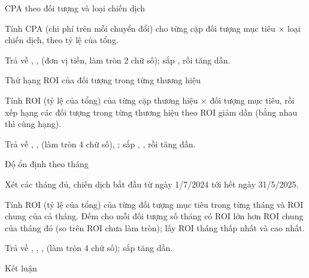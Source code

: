 \documentclass[11pt,a4paper]{article}
\begin{document}
\begin{cauhoi}[ma=mkt-c8-doi-tuong-dang-tang-ngan-sach, dulieu=mkt, domain=customer,
  hinhthuc=case, cap=hard, diem=50, tacgia={A}, trangthai=review, bokiemtra={public, hidden-1}, thutu=co, saiso=0.01]
\begin{buoc}[ma=b2, diem=10, hinhthuc=write, bang={campaigns, campaign_types}]{CPA theo đối tượng và loại chiến dịch}
  \begin{yeucau}
    \item Tính CPA (chi phí trên mỗi chuyển đổi) cho từng cặp đối tượng mục tiêu × loại chiến dịch, theo tỷ lệ của tổng.
    \item Trả về , ,  (đơn vị tiền, làm tròn 2 chữ số); sắp , rồi  tăng dần.
  \end{yeucau}
\end{buoc}
\begin{buoc}[ma=b3, diem=10, hinhthuc=write, bang={campaigns, brands}]{Thứ hạng ROI của đối tượng trong từng thương hiệu}
  \begin{yeucau}
    \item Tính ROI (tỷ lệ của tổng) của từng cặp thương hiệu × đối tượng mục tiêu, rồi xếp hạng các đối tượng trong từng thương hiệu theo ROI giảm dần (bằng nhau thì cùng hạng).
    \item Trả về , ,  (làm tròn 4 chữ số), ; sắp , , rồi  tăng dần.
  \end{yeucau}
\end{buoc}
\begin{buoc}[ma=b4, diem=10, hinhthuc=write, bang={campaigns, calendar}]{Độ ổn định theo tháng}
  \begin{yeucau}
    \item Xét các tháng đủ, chiến dịch bắt đầu từ ngày 1/7/2024 tới hết ngày 31/5/2025.
    \item Tính ROI (tỷ lệ của tổng) của từng đối tượng mục tiêu trong từng tháng và ROI chung của cả tháng. Đếm cho mỗi đối tượng số tháng có ROI lớn hơn ROI chung của tháng đó (so trên ROI chưa làm tròn); lấy ROI tháng thấp nhất và cao nhất.
    \item Trả về , , ,  (làm tròn 4 chữ số); sắp  tăng dần.
  \end{yeucau}
\end{buoc}
\begin{buoc}[ma=b5, diem=10, hinhthuc=ketluan, bang={campaigns, audiences}]{Kết luận}

\end{buoc}
\end{cauhoi}
\end{document}
